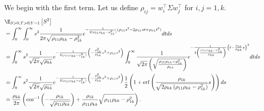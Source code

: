 \documentclass{article}
\begin{document}
We begin with the first term.
Let us define $\rho_{ij} = w_i^\top \Sigma w_j^\top$ for $i,j = 1,k$.
\begin{align}
  &\E_{S > 0, T > 0 \mid Y=1} \left[ S^2 \right] \\
  &= \int_0^\infty \int_0^\infty s^2 \frac{1}{2\pi \sqrt{\rho_{11} \rho_{kk} - \rho_{1k}^2}} e^{-\frac{1}{2 (\rho_{11} \rho_{kk} - \rho_{1k}^2)}( \rho_{11} s^2 - 2 \rho_{1k} st + \rho_{kk} t^2 )} dt ds \\
  &= \int_0^\infty s^2 \frac{1}{\sqrt{2\pi} \sqrt{\rho_{kk}}} e^{ -\frac{1}{2 (\rho_{11} \rho_{kk} - \rho_{1k}^2) } \left( - \frac{\rho_{1k}^2}{\rho_{kk}} s^2 + \rho_{11} s^2 \right) } \int_0^\infty \frac{1}{\sqrt{2\pi} \left( \sqrt{ \frac{ \rho_{11} \rho_{kk} - \rho_{1k}^2 }{ \rho_{kk} } } \right)} e^{-\frac{1}{2 \left( \frac{ \rho_{11} \rho_{kk} - \rho_{1k}^2 }{ \rho_{kk} } \right)} \left( t - \frac{\rho_{1k}}{\rho_{kk}} s \right)^2 } dt ds \\ %
  &= \int_0^\infty s^2 \frac{1}{\sqrt{2\pi} \sqrt{\rho_{kk}}} e^{ -\frac{1}{2 (\rho_{11} \rho_{kk} - \rho_{1k}^2) } \left( - \frac{\rho_{1k}^2}{\rho_{kk}} s^2 + \rho_{11} s^2 \right) } \frac{1}{2}\left(1+\operatorname{erf}\left(\frac{\rho_{1k}}{\sqrt{2\rho_{kk}\left(\rho_{11}\rho_{kk}-\rho_{1k}^{2}\right)}}s\right)\right) ds \\
  &= \frac{\rho_{kk}}{2\pi}\left(\cos^{-1}\left(-\frac{\rho_{1k}}{\sqrt{\rho_{11}\rho_{kk}}}\right)+\frac{\rho_{1k}}{\rho_{11}\rho_{kk}}\sqrt{\rho_{11}\rho_{kk}-\rho_{1k}^{2}}\right).
\end{align}
\end{document}
